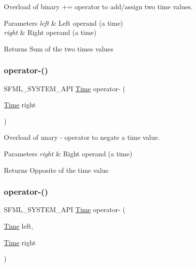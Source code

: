 Overload of binary += operator to add/assign two time values. 


\begin{DoxyParams}{Parameters}
{\em left} & Left operand (a time) \\
\hline
{\em right} & Right operand (a time)\\
\hline
\end{DoxyParams}
\begin{DoxyReturn}{Returns}
Sum of the two times values 
\end{DoxyReturn}
\mbox{\label{classsf_1_1_time_a1b23b91cf367764338c2ff922c65da4e}} 
\subsubsection{\texorpdfstring{operator-\/()}{operator-()}\hspace{0.1cm}{\footnotesize\ttfamily [1/2]}}
{\footnotesize\ttfamily S\+F\+M\+L\+\_\+\+S\+Y\+S\+T\+E\+M\+\_\+\+A\+PI \hyperlink{classsf_1_1_time}{Time} operator-\/ (\begin{DoxyParamCaption}\item[{\hyperlink{classsf_1_1_time}{Time}}]{right }\end{DoxyParamCaption})\hspace{0.3cm}{\ttfamily [related]}}



Overload of unary -\/ operator to negate a time value. 


\begin{DoxyParams}{Parameters}
{\em right} & Right operand (a time)\\
\hline
\end{DoxyParams}
\begin{DoxyReturn}{Returns}
Opposite of the time value 
\end{DoxyReturn}
\mbox{\label{classsf_1_1_time_ace92ab9bc7aec80239af7218cd89cc80}} 
\subsubsection{\texorpdfstring{operator-\/()}{operator-()}\hspace{0.1cm}{\footnotesize\ttfamily [2/2]}}
{\footnotesize\ttfamily S\+F\+M\+L\+\_\+\+S\+Y\+S\+T\+E\+M\+\_\+\+A\+PI \hyperlink{classsf_1_1_time}{Time} operator-\/ (\begin{DoxyParamCaption}\item[{\hyperlink{classsf_1_1_time}{Time}}]{left,  }\item[{\hyperlink{classsf_1_1_time}{Time}}]{right }\end{DoxyParamCaption})\hspace{0.3cm}{\ttfamily [related]}}



